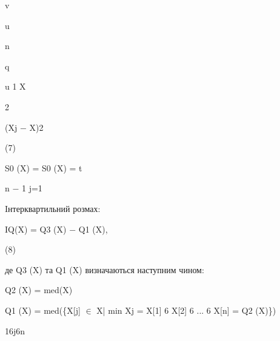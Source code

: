 \documentclass[a4paper,portrait,12pt]{article}
\begin{document}
\begin{flushleft}
v
\end{flushleft}


\begin{flushleft}
u
\end{flushleft}


\begin{flushleft}
n
\end{flushleft}


\begin{flushleft}
q
\end{flushleft}


\begin{flushleft}
u 1 X
\end{flushleft}


2


\begin{flushleft}
(Xj $-$ X)2
\end{flushleft}


(7)


\begin{flushleft}
S0 (X) = S0 (X) = t
\end{flushleft}


\begin{flushleft}
n $-$ 1 j=1
\end{flushleft}


\begin{flushleft}
Iнтерквартильний розмах:
\end{flushleft}


\begin{flushleft}
IQ(X) = Q3 (X) $-$ Q1 (X),
\end{flushleft}





(8)





\begin{flushleft}
де Q3 (X) та Q1 (X) визначаються наступним чином:
\end{flushleft}


\begin{flushleft}
Q2 (X) = med(X)
\end{flushleft}


\begin{flushleft}
Q1 (X) = med(\{X[j] $\in$ X| min Xj = X[1] 6 X[2] 6 ... 6 X[n] = Q2 (X)\})
\end{flushleft}


\begin{flushleft}
16j6n
\end{flushleft}
\end{document}
